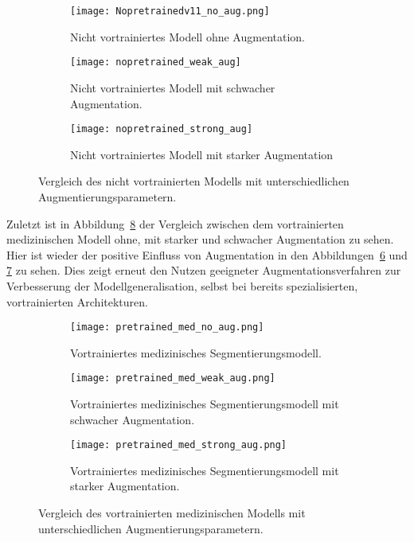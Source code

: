 \documentclass[
	german,
	accentcolor=10c,%
	type=intern,
	marginpar=false
	]{tudapub}
\begin{document}
\begin{figure}[H]
    \centering
    \begin{subfigure}[b]{0.3\textwidth}
        \texttt{[image: Nopretrainedv11\_no\_aug.png]}
        \caption{Nicht vortrainiertes Modell ohne Augmentation.}
        \label{fig:nopretrainedv11_no_aug}
    \end{subfigure}
    \hfill
    \begin{subfigure}[b]{0.3\textwidth}
        \texttt{[image: nopretrained\_weak\_aug]}
        \caption{Nicht vortrainiertes Modell mit schwacher Augmentation.}
        \label{fig:nopretrained_weak_aug}
    \end{subfigure}
    \hfill
    \begin{subfigure}[b]{0.3\textwidth}
        \texttt{[image: nopretrained\_strong\_aug]}
        \caption{Nicht vortrainiertes Modell mit starker Augmentation}
        \label{fig:nopretrained_strong_aug}
    \end{subfigure}    
    \caption{Vergleich des nicht vortrainierten Modells mit unterschiedlichen Augmentierungsparametern.}
    \label{fig:nopretrained}
\end{figure}

Zuletzt ist in Abbildung~\ref{fig:pretrained_med} der Vergleich zwischen dem vortrainierten medizinischen Modell ohne, mit starker und schwacher Augmentation zu sehen. Hier ist wieder der positive Einfluss von Augmentation in den Abbildungen~\ref{fig:pretrained_med_weak_aug} und \ref{fig:pretrained_med_strong_aug} zu sehen. Dies zeigt erneut den Nutzen geeigneter Augmentationsverfahren zur Verbesserung der Modellgeneralisation, selbst bei bereits spezialisierten, vortrainierten Architekturen.

\begin{figure}[H]
    \centering
    \begin{subfigure}[b]{0.3\textwidth}
        \texttt{[image: pretrained\_med\_no\_aug.png]}
        \caption{Vortrainiertes medizinisches Segmentierungsmodell.}
        \label{fig:pretrained_med_no_aug2}
    \end{subfigure}
    \hfill
    \begin{subfigure}[b]{0.3\textwidth}
        \texttt{[image: pretrained\_med\_weak\_aug.png]}
        \caption{Vortrainiertes medizinisches Segmentierungsmodell mit schwacher Augmentation.}
        \label{fig:pretrained_med_weak_aug}
    \end{subfigure}
    \hfill
    \begin{subfigure}[b]{0.3\textwidth}
        \texttt{[image: pretrained\_med\_strong\_aug.png]}
        \caption{Vortrainiertes medizinisches Segmentierungsmodell mit starker Augmentation.}
        \label{fig:pretrained_med_strong_aug}
    \end{subfigure}    
    \caption{Vergleich des vortrainierten medizinischen Modells mit unterschiedlichen Augmentierungsparametern.}
    \label{fig:pretrained_med}
\end{figure}
\end{document}
